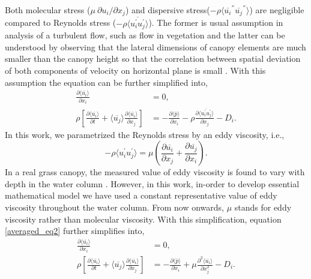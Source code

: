\documentclass[12pt]{report}   %
\newcommand{\del}{\partial}
\renewcommand{\bar}{\overline}
\begin{document}
 Both molecular stress ($ \mu\ \del u_i / \del x_j $) and dispersive stress($-\rho \langle \bar{u_i}^{''} \bar{u_j}^{''} \rangle $) are negligible compared to Reynolds stress ($-\rho \langle\bar{ u_i^{'} u_j^{'} } \rangle $). The former is usual assumption in analysis of a turbulent flow, such as flow in vegetation and the latter can be understood by observing that the
 lateral dimensions of canopy elements are much smaller than the canopy height so that the correlation between spatial deviation of both components of velocity on horizontal plane is small \cite{Raupach94,Raupach96}. With this assumption the equation can be further simplified into,
 \begin{equation}\label{averaged_eq2}
  \begin{split}
  \frac{\partial \langle \bar{u_i} \rangle}{\partial x_i}&=0 ,\\
 \rho \left[ \frac{\partial \langle \overline{u_i} \rangle }{\partial t}+ \langle \overline{u_j} \rangle \frac{\partial \langle \bar{u_i} \rangle}{\partial x_j} \right ] &= -\frac{\partial \langle \bar{p} \rangle  }{\partial x_i} -\rho \frac{\partial \langle \bar{u_i^{'}u_j^{'}} \rangle }{\partial x_j} -D_i .
 \end{split}
\end{equation}
In this work, we parametrized the Reynolds stress by an eddy viscosity, i.e., 
\[ -\rho \langle u_i^{'} u_j^{'} \rangle = \mu \left(\frac{\del \bar{u_i} }{\del x_j} + \frac{\del \bar {u_j} }{\del x_i}  \right) .\]
In a real grass canopy, the measured value of eddy viscosity is found to vary with depth in the water column \cite{Nepf04}. However, in this work, in-order to develop essential mathematical model we have used a constant representative value of eddy viscosity throughout the water column.
From now onwards, $\mu$ stands for eddy viscosity rather than molecular viscosity. With this simplification, equation \ref{averaged_eq2} further simplifies into,
 \begin{equation}\label{averaged_eq3}
  \begin{split}
  \frac{\partial \langle \bar{u_i} \rangle}{\partial x_i}&=0, \\
 \rho \left[ \frac{\partial \langle \overline{u_i} \rangle }{\partial t}+ \langle \overline{u_j} \rangle \frac{\partial \langle \bar{u_i} \rangle}{\partial x_j} \right ] &= -\frac{\partial \langle \bar{p} \rangle  }{\partial x_i} +\mu \frac{\partial^2 \langle \bar{u_i} \rangle }{\partial x_j^2} - D_i .
 \end{split}
\end{equation}
\end{document}
